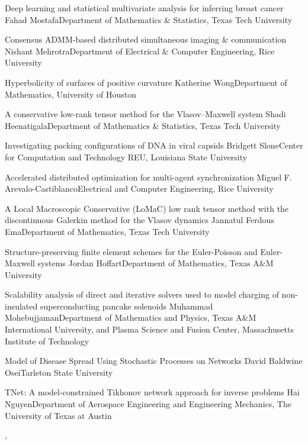 \begin{posters}
\item\poster
{Deep learning and statistical multivariate analysis for inferring breast cancer}
{Fahad Mostafa}{Department of Mathematics \& Statistics, Texas Tech University}

\item\poster
{Consensus ADMM-based distributed simultaneous imaging \& communication}
{Nishant Mehrotra}{Department of Electrical \& Computer Engineering, Rice University}

\item\poster
{Hyperbolicity of surfaces of positive curvature}
{Katherine Wong}{Department of Mathematics, University of Houston}

\item\poster
{A conservative low-rank tensor method for the Vlasov–Maxwell system}
{Shadi Heenatigala}{Department of Mathematics \& Statistics, Texas Tech University}

\item\poster
{Investigating packing configurations of DNA in viral capsids}
{Bridgett Slone}{Center for Computation and Technology REU, Louisiana State University}

\item\poster
{Accelerated distributed optimization for multi-agent synchronization}
{Miguel F. Arevalo-Castiblanco}{Electrical and Computer Engineering, Rice University}

\item\poster
{A Local Macroscopic Conservative (LoMaC) low rank tensor method with the discontinuous Galerkin method for the Vlasov dynamics}
{Jannatul Ferdous Ema}{Department of Mathematics, Texas Tech University}

\item\poster
{Structure-preserving finite element schemes for the Euler-Poisson and Euler-Maxwell systems}
{Jordan Hoffart}{Department of Mathematics, Texas A\&M University}

\item\poster
{Scalability analysis of direct and iterative solvers used to model charging of non-insulated superconducting pancake solenoids}
{Muhammad Mohebujjaman}{Department of Mathematics and Physics, Texas A\&M International University, and Plasma Science and Fusion Center, Massachusetts Institute of Technology}

\item\poster
{Model of Disease Spread Using Stochastic Processes on Networks}
{David Baldwine Osei}{Tarleton State University}


\item\poster
{TNet: A model-constrained Tikhonov network approach for inverse problems}
{Hai Nguyen}{Department of Aerospace Engineering and Engineering Mechanics, The University of Texas at Austin}


\end{posters}

\room



,
